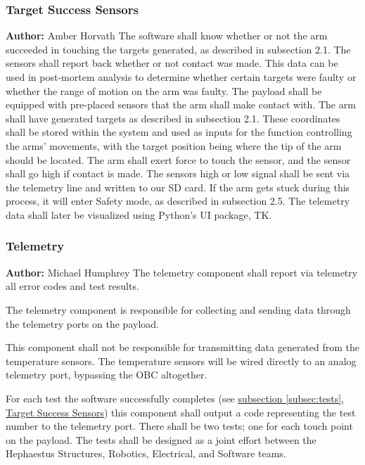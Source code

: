 \subsubsection{Target Success Sensors}
\textbf{Author:} Amber Horvath
\label{subsec:tests}
The software shall know whether or not the arm succeeded in touching the targets generated, as described in subsection 2.1. The sensors
shall report back whether or not contact was made. This data can be used in post-mortem analysis to determine whether
certain targets were faulty or whether the range of motion on the arm was faulty.
The payload shall be equipped with pre-placed sensors that the arm shall make contact with. The arm shall have generated targets
as described in subsection 2.1. These coordinates shall be stored within the system and used as inputs for the function controlling
the arms' movements, with the target position being where the tip of the arm should be located. The arm shall exert force to touch
the sensor, and the sensor shall go high if contact is made. The sensors high or low signal shall be sent via the telemetry
line and written to our SD card. If the arm gets stuck during this process, it will enter Safety mode, as described in subsection 2.5. The telemetry data shall
later be visualized using Python's UI package, TK. 

\subsubsection{Telemetry}
\textbf{Author:} Michael Humphrey
The telemetry component shall report via telemetry all error codes and test results.

The telemetry component is responsible for collecting and sending data through the
telemetry ports on the \gls{payload}.

This component shall not be responsible for transmitting data generated from the
temperature sensors.
The temperature sensors will be wired directly to an analog telemetry port,
bypassing the \gls{OBC} altogether.

For each test the software successfully completes (see \hyperref[subsec:tests]{subsection 
\ref*{subsec:tests},  Target Success Sensors}) this component shall output a code
representing the test number to the telemetry port.
There shall be two tests; one for each touch point on the \gls{payload}.
The tests shall be designed as a joint effort between the Hephaestus Structures,
Robotics, Electrical, and Software teams.

